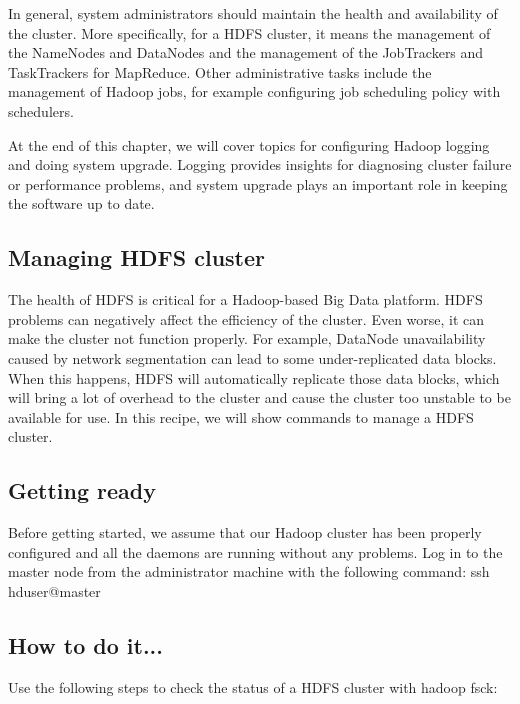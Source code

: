 In general, system administrators should maintain the health and availability of the cluster. More specifically, for a HDFS cluster, it means the management of the NameNodes and DataNodes and the management of the JobTrackers and TaskTrackers for MapReduce. Other administrative tasks include the management of Hadoop jobs, for example configuring job scheduling policy with schedulers.

At the end of this chapter, we will cover topics for configuring Hadoop logging and doing system upgrade. Logging provides insights for diagnosing cluster failure or performance problems, and system upgrade plays an important role in keeping the software up to date.

\subsection*{Managing HDFS cluster}
The health of HDFS is critical for a Hadoop-based Big Data platform. HDFS problems can negatively affect the efficiency of the cluster. Even worse, it can make the cluster not function properly. For example, DataNode unavailability caused by network segmentation can lead to some under-replicated data blocks. When this happens, HDFS will automatically replicate those data blocks, which will bring a lot of overhead to the cluster and cause the cluster too unstable to be available for use. In this recipe, we will show commands to manage a HDFS cluster.
\subsection*{Getting ready}
Before getting started, we assume that our Hadoop cluster has been properly configured and all the daemons are running without any problems.
Log in to the master node from the administrator machine with the following command:
ssh hduser@master
\subsection*{How to do it...}
Use the following steps to check the status of a HDFS cluster with hadoop fsck:

